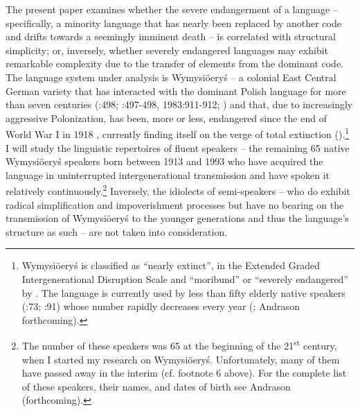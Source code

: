 \documentclass[output=paper]{langscibook}
\begin{document}
The present paper examines whether the severe endangerment of a language – specifically, a minority language that has nearly been replaced by another code and drifts towards a seemingly imminent death – is correlated with structural simplicity; or, inversely, whether severely endangered languages may exhibit remarkable complexity due to the transfer of elements from the dominant code. The language system under analysis is Wymysiöeryś – a colonial East Central German variety that has interacted with the dominant Polish language for more than seven centuries (\citealt{Putschke1980}:498; \citealt{Wiesinger1980}:497-498, 1983:911-912; \citealt{Wicherkiewicz2003}) and that, due to increasingly aggressive Polonization, has been, more or less, endangered since the end of World War I in 1918 \citep{Neels2016}, currently finding itself on the verge of total extinction (\citealt{AndrasonKról2016}).\footnote{Wymysiöeryś is classified as “nearly extinct”, in the Extended Graded Intergenerational Disruption Scale and “moribund” or “severely endangered” by \citet{Mosely2010}. The language is currently used by less than fifty elderly native speakers (\citealt{Ritchie2016}:73; \citealt{Chromik2016}:91) whose number rapidly decreases every year (\citealt{AndrasonKról2016}; Andrason forthcoming).} I will study the linguistic repertoires of fluent speakers – the remaining 65 native Wymysiöeryś speakers born between 1913 and 1993 who have acquired the language in uninterrupted intergenerational transmission and have spoken it relatively continuously.\footnote{The number of these speakers was 65 at the beginning of the 21\textsuperscript{st} century, when I started my research on Wymysiöeryś. Unfortunately, many of them have passed away in the interim (cf. footnote 6 above). For the complete list of these speakers, their names, and dates of birth see Andrason (forthcoming).} Inversely, the idiolects of semi-speakers – who do exhibit radical simplification and impoverishment processes but have no bearing on the transmission of Wymysiöeryś to the younger generations and thus the language’s structure as such – are not taken into consideration.
\end{document}
